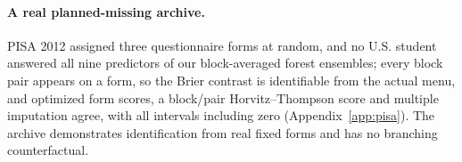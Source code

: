 \paragraph{A real planned-missing archive.}
PISA 2012 assigned three questionnaire forms at random, and no U.S. student answered all nine predictors of our block-averaged forest ensembles; every block pair appears on a form, so the Brier contrast is identifiable from the actual menu, and optimized form scores, a block/pair Horvitz--Thompson score and multiple imputation agree, with all intervals including zero (Appendix~\ref{app:pisa}). The archive demonstrates identification from real fixed forms and has no branching counterfactual.
